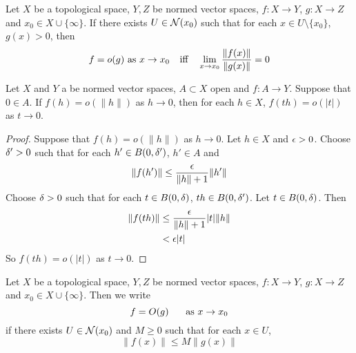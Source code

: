 \documentclass{book}
\begin{document}
	\begin{ex} \lex{}
	Let $X$ be a topological space, $Y, Z$ be normed vector spaces, $f:X \rightarrow Y$, $g: X \rightarrow Z$ and $x_0 \in X \cup \{\infty\}$. If there exists $U \in \mathcal{N}(x_0)$ such that for each $x \in U \setminus \{x_0\}$, $g(x) > 0$, then $$f = o(g) \text{ as } x \rightarrow x_0 \hspace{.25cm} \text{ iff } \hspace{.25cm}  \lim_{x \rightarrow x_0} \frac{\| f(x) \|}{\| g(x) \|} = 0$$
	\end{ex}	
	
	\begin{ex} \lex{}
	Let $X$ and $Y$ a be normed vector spaces, $A \subset X$ open and $f:A \rightarrow Y$. Suppose that $0 \in A$. If $f(h) = o(\|h\|)$ as $h \rightarrow 0$, then for each $h \in X$,  $f(th) = o(|t|)$ as $t \rightarrow 0$.
	\end{ex}	
	
	\begin{proof}
	Suppose that $f(h) = o(\|h\|)$ as $h \rightarrow 0$.  Let $h \in X$ and $\epsilon >0$. Choose $\delta' >0 $ such that for each $h' \in B(0, \delta')$, $h' \in A$ and 
	$$\|f(h')\| \leq \frac{\epsilon}{\|h\|+1} \|h'\|$$ 
	Choose $\delta >0$ such that for each $t \in B(0,\delta)$, $th \in B(0,\delta')$. Let $t \in B(0,\delta)$. Then 
	\begin{align*}
	\|f(th)\| 
	&\leq \frac{\epsilon}{\|h\|+1} |t|\|h\| \\
	&< \epsilon |t|
	\end{align*}
	So $f(th) = o(|t|)$ as $t \rightarrow 0$.
	\end{proof}		
	
	
	
	
	\begin{defn} \ld{}
	Let $X$ be a topological space, $Y, Z$ be normed vector spaces, $f:X \rightarrow Y$, $g: X \rightarrow Z$ and $x_0 \in X \cup \{\infty\}$. Then we write $$f = O(g) \hspace{.5cm} \text{ as } x \rightarrow x_0$$ if there exists $U \in \mathcal{N}(x_0)$ and $M \geq 0$ such that for each $x \in U$, $$\|f(x)\| \leq M\|g(x)\|$$
	\end{defn}
	
	
	
	
	
	
	
	
	
	
	
	
	
	
	
	
	
\end{document}
